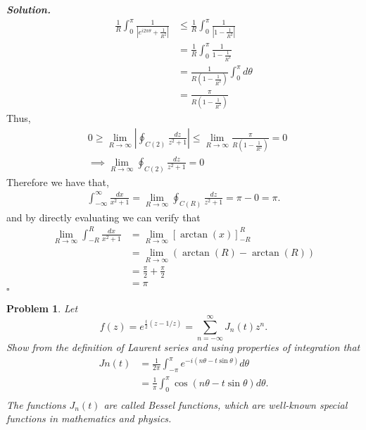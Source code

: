 \documentclass[12pt]{report}
\newtheorem{problem}{Problem}
\newenvironment{solution}[1][\it{Solution}]{\textbf{#1. } }{$\square$}
\begin{document}
\begin{solution}
    \begin{align*}
        \frac{1}{R} \int_0^\pi \frac{1}{\left|e^{i2\pi\theta} + \frac{1}{R^2}\right|} &\leq \frac{1}{R} \int_0^\pi \frac{1}{\left|1 - \frac{1}{R^2}\right|}\\
        &=\frac{1}{R} \int_0^\pi \frac{1}{1 - \frac{1}{R^2}}\\
        &= \frac{1}{R(1 - \frac{1}{R^2})}\int_0^\pi d\theta\\
        &= \frac{\pi}{R(1 - \frac{1}{R^2})}
    \end{align*}
    Thus,
    \begin{align*}
        &0 \geq \lim_{R \rightarrow \infty} \left| \oint_{C(2)}\frac{dz}{z^2 + 1}\right| \leq \lim_{R \rightarrow \infty} \frac{\pi}{R(1-\frac{1}{R^2})} = 0\\
        &\implies \lim_{R \rightarrow \infty} \oint_{C(2)}\frac{dz}{z^2 + 1} = 0
    \end{align*}
    Therefore we have that,
    \begin{align*}
        \int_{-\infty}^{\infty} \frac{dx}{x^2 + 1} = \lim_{R \rightarrow \infty} \oint_{C(R)} \frac{dz}{z^2 + 1} = \pi - 0 = \pi.
    \end{align*}
    and by directly evaluating we can verify that
    \begin{align*}
        \lim_{R\rightarrow\infty}\int_{-R}^{R}\frac{dx}{x^2 + 1} &= \lim_{R \rightarrow \infty} \left[ \arctan(x) \right]_{-R}^{R}\\
        &= \lim_{R \rightarrow \infty}(\arctan(R) - \arctan(R))\\
        &= \frac{\pi}{2} + \frac{\pi}{2}\\
        &= \pi
    \end{align*}
\end{solution}

\newpage



\begin{problem}
    Let $$f(z) = e^{\frac{t}{2}(z-1/z)} = \sum_{n=-\infty}^{\infty} J_n(t)z^n.$$ Show from the definition of Laurent series and using properties of integration that 
    \begin{align*}
        Jn(t) &= \frac{1}{2\pi} \int_{-\pi}^{\pi} e^{-i(n\theta-t\sin\theta)}d\theta\\
              &= \frac{1}{\pi} \int_0^\pi \cos(n\theta - t\sin \theta)d\theta.\\
    \end{align*} 
    The functions $J_n(t)$ are called Bessel functions, which are well-known special functions in mathematics and physics.
\end{problem}
\end{document}
